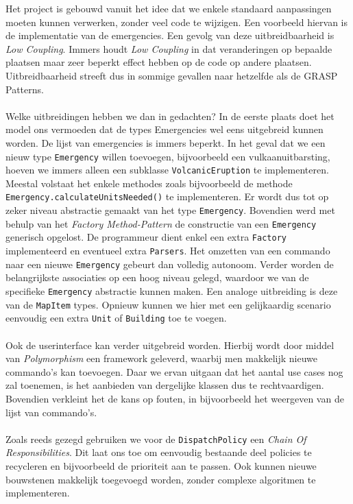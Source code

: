 \label{uitbreidbaarheid}
Het project is gebouwd vanuit het idee dat we enkele standaard aanpassingen moeten kunnen verwerken, zonder veel code te wijzigen. Een voorbeeld hiervan is de implementatie van de emergencies. Een gevolg van deze uitbreidbaarheid is \textit{Low Coupling}. Immers houdt \textit{Low Coupling} in dat veranderingen op bepaalde plaatsen maar zeer beperkt effect hebben op de code op andere plaatsen. Uitbreidbaarheid streeft dus in sommige gevallen naar hetzelfde als de GRASP Patterns.
\paragraph{}
Welke uitbreidingen hebben we dan in gedachten? In de eerste plaats doet het model ons vermoeden dat de types Emergencies wel eens uitgebreid kunnen worden. De lijst van emergencies is immers beperkt. In het geval dat we een nieuw type \texttt{Emergency} willen toevoegen, bijvoorbeeld een vulkaanuitbarsting, hoeven we immers alleen een subklasse \texttt{VolcanicEruption} te implementeren. Meestal volstaat het enkele methodes zoals bijvoorbeeld de methode \texttt{Emergency.calculateUnitsNeeded()} te implementeren. Er wordt dus tot op zeker niveau abstractie gemaakt van het type \texttt{Emergency}. Bovendien werd met behulp van het \textit{Factory Method-Pattern} de constructie van een \texttt{Emergency} generisch opgelost. De programmeur dient enkel een extra \texttt{Factory} implementeerd en eventueel extra \texttt{Parsers}. Het omzetten van een commando naar een nieuwe \texttt{Emergency} gebeurt dan volledig autonoom. Verder worden de belangrijkste associaties op een hoog niveau gelegd, waardoor we van de specifieke \texttt{Emergency} abstractie kunnen maken. Een analoge uitbreiding is deze van de \texttt{MapItem} types. Opnieuw kunnen we hier met een gelijkaardig scenario eenvoudig een extra \texttt{Unit} of \texttt{Building} toe te voegen.
\paragraph{}
Ook de userinterface kan verder uitgebreid worden. Hierbij wordt door middel van \textit{Polymorphism} een framework geleverd, waarbij men makkelijk nieuwe commando's kan toevoegen. Daar we ervan uitgaan dat het aantal use cases nog zal toenemen, is het aanbieden van dergelijke klassen dus te rechtvaardigen. Bovendien verkleint het de kans op fouten, in bijvoorbeeld het weergeven van de lijst van commando's.
\paragraph{}
Zoals reeds gezegd gebruiken we voor de \texttt{DispatchPolicy} een \textit{Chain Of Responsibilities}. Dit laat ons toe om eenvoudig bestaande deel policies te recycleren en bijvoorbeeld de prioriteit aan te passen. Ook kunnen nieuwe bouwstenen makkelijk toegevoegd worden, zonder complexe algoritmen te implementeren.

